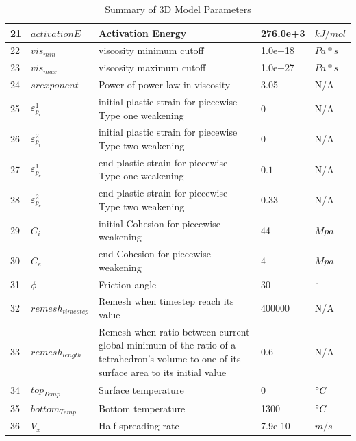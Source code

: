 \begin{table}[h]
\begin{tabular}[h]{l l p{6.8cm} l l}
\hline
21   &  $activationE$    &    Activation Energy      & 276.0e+3   & $kJ/mol$  \\
\hline
22   &  $vis_{min}$    &    viscosity minimum cutoff      & 1.0e+18   & $Pa*s$  \\
\hline
23   &  $vis_{max}$    &    viscosity maximum cutoff      & 1.0e+27   & $Pa*s$  \\
\hline
24   &  $srexponent$    &    Power of power law in viscosity       & 3.05   & N/A  \\
\hline
25   &  $\varepsilon_{p_{i}}^{1}$    &    initial plastic strain for piecewise Type one weakening       & $0$   & N/A  \\
\hline
26   &  $\varepsilon_{p_{i}}^{2}$    &    initial plastic strain for piecewise Type two weakening       & $0$   & N/A  \\
\hline
27   &  $\varepsilon_{p_{e}}^{1}$    &    end plastic strain for piecewise Type one weakening       & $0.1$   & N/A  \\
\hline
28   &  $\varepsilon_{p_{e}}^{2}$    &    end plastic strain for piecewise Type two weakening       & $0.33$   & N/A  \\
\hline
29   &  $C_{i}$    &    initial Cohesion for piecewise weakening       & 44   & $Mpa$  \\
\hline
30   &  $C_{e}$    &    end Cohesion for piecewise weakening       & 4   & $Mpa$  \\
\hline
31   &  $\phi$    &    Friction angle      & 30   & $\degree$  \\
\hline
32   &  $remesh_{timestep}$    &    Remesh when timestep reach its value      & 400000   & N/A  \\
\hline
33   &  $remesh_{length}$    &    Remesh when ratio between current global minimum of the ratio of a tetrahedron’s volume to one of its surface area to its initial value      & 0.6   & N/A  \\
\hline
34   &  $top_{Temp}$    &    Surface temperature      & 0   & $\degree C$  \\
\hline
35   &  $bottom_{Temp}$    &    Bottom temperature      & 1300   & $\degree C$  \\
\hline
36   &  $V_{x}$    &    Half spreading rate      & 7.9e-10   & $m/s$  \\

\hline
\hline
\end{tabular}

\caption{Summary of 3D Model Parameters}
\label{Tab_ModelParameters}
\end{table}

